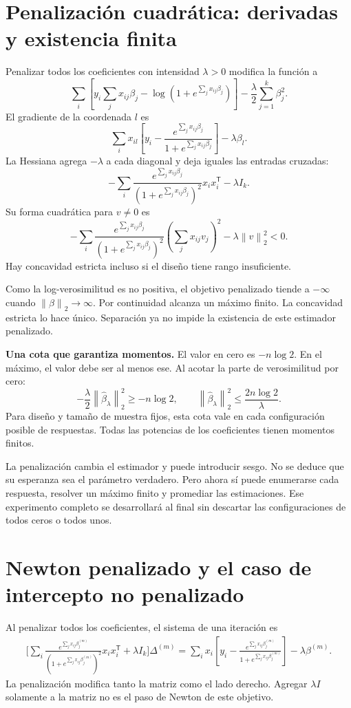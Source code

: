 \documentclass[11pt,a4paper]{article}
\newcommand{\T}{^{\mathsf T}}
\newcommand{\norm}[1]{\left\lVert #1\right\rVert}
\begin{document}
\clearpage
\section{Penalización cuadrática: derivadas y existencia finita}\label{logit65}
Penalizar todos los coeficientes con intensidad $\lambda>0$
modifica la función a
\[
\sum_i\left[y_i\sum_jx_{ij}\beta_j
-\log(1+e^{\sum_jx_{ij}\beta_j})\right]
-\frac\lambda2\sum_{j=1}^k\beta_j^2.
\]
El gradiente de la coordenada $l$ es
\[
\sum_i x_{il}\left[y_i-
\frac{e^{\sum_jx_{ij}\beta_j}}{1+e^{\sum_jx_{ij}\beta_j}}\right]
-\lambda\beta_l.
\]
La Hessiana agrega $-\lambda$ a cada diagonal y deja
iguales las entradas cruzadas:
\[
-\sum_i
\frac{e^{\sum_jx_{ij}\beta_j}}
{(1+e^{\sum_jx_{ij}\beta_j})^2}x_ix_i\T-\lambda I_k.
\]
Su forma cuadrática para $v\ne0$ es
\[
-\sum_i
\frac{e^{\sum_jx_{ij}\beta_j}}
{(1+e^{\sum_jx_{ij}\beta_j})^2}
\left(\sum_jx_{ij}v_j\right)^2-\lambda\norm v_2^2<0.
\]
Hay concavidad estricta incluso si el diseño tiene
rango insuficiente.

Como la log-verosimilitud es no positiva,
el objetivo penalizado tiende a $-\infty$
cuando $\norm\beta_2\to\infty$.
Por continuidad alcanza un máximo finito.
La concavidad estricta lo hace único.
Separación ya no impide la existencia de este
estimador penalizado.

\textbf{Una cota que garantiza momentos.}
El valor en cero es $-n\log2$.
En el máximo, el valor debe ser al menos ese.
Al acotar la parte de verosimilitud por cero:
\[
-\frac\lambda2\norm{\widehat\beta_\lambda}_2^2
\ge -n\log2,\qquad
\boxed{\norm{\widehat\beta_\lambda}_2^2
\le\frac{2n\log2}{\lambda}}.
\]
Para diseño y tamaño de muestra fijos, esta cota
vale en cada configuración posible de respuestas.
Todas las potencias de los coeficientes tienen
momentos finitos.

La penalización cambia el estimador y puede introducir sesgo.
No se deduce que su esperanza sea el parámetro verdadero.
Pero ahora sí puede enumerarse cada respuesta, resolver
un máximo finito y promediar las estimaciones.
Ese experimento completo se desarrollará al final
sin descartar las configuraciones de todos ceros o todos unos.

\clearpage
\section{Newton penalizado y el caso de intercepto no penalizado}\label{logit66}
Al penalizar todos los coeficientes, el sistema de una
iteración es
\[
\begin{aligned}
\bigg[
\sum_i\frac{e^{\sum_jx_{ij}\beta_j^{(m)}}}
{(1+e^{\sum_jx_{ij}\beta_j^{(m)}})^2}x_ix_i\T
+\lambda I_k
\bigg]\Delta^{(m)}
=
\sum_i x_i\left[
y_i-\frac{e^{\sum_jx_{ij}\beta_j^{(m)}}}
{1+e^{\sum_jx_{ij}\beta_j^{(m)}}}\right]-\lambda\beta^{(m)}.
\end{aligned}
\]
La penalización modifica tanto la matriz como el
lado derecho. Agregar $\lambda I$ solamente a la
matriz no es el paso de Newton de este objetivo.
\end{document}
